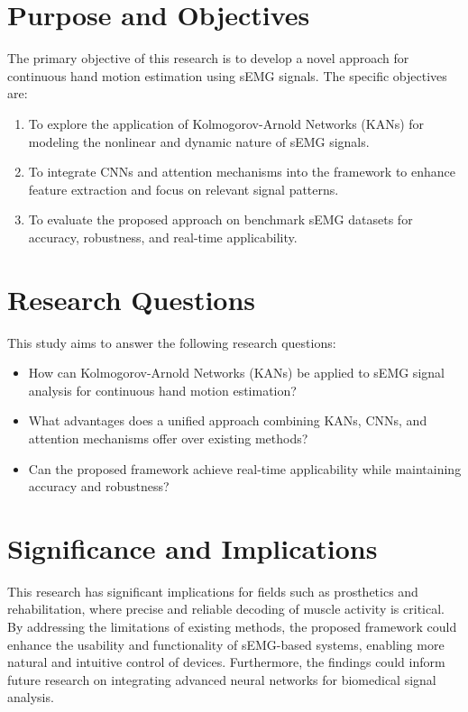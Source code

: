 \section{Purpose and Objectives}
The primary objective of this research is to develop a novel approach for continuous hand motion estimation using sEMG signals. The specific objectives are:
\begin{enumerate}
    \item To explore the application of Kolmogorov-Arnold Networks (KANs) for modeling the nonlinear and dynamic nature of sEMG signals.
    \item To integrate CNNs and attention mechanisms into the framework to enhance feature extraction and focus on relevant signal patterns.
    \item To evaluate the proposed approach on benchmark sEMG datasets for accuracy, robustness, and real-time applicability.
\end{enumerate}

\section{Research Questions}
This study aims to answer the following research questions:
\begin{itemize}
    \item How can Kolmogorov-Arnold Networks (KANs) be applied to sEMG signal analysis for continuous hand motion estimation?
    \item What advantages does a unified approach combining KANs, CNNs, and attention mechanisms offer over existing methods?
    \item Can the proposed framework achieve real-time applicability while maintaining accuracy and robustness?
\end{itemize}

\section{Significance and Implications}
This research has significant implications for fields such as prosthetics and rehabilitation, where precise and reliable decoding of muscle activity is critical. By addressing the limitations of existing methods, the proposed framework could enhance the usability and functionality of sEMG-based systems, enabling more natural and intuitive control of devices. Furthermore, the findings could inform future research on integrating advanced neural networks for biomedical signal analysis.

